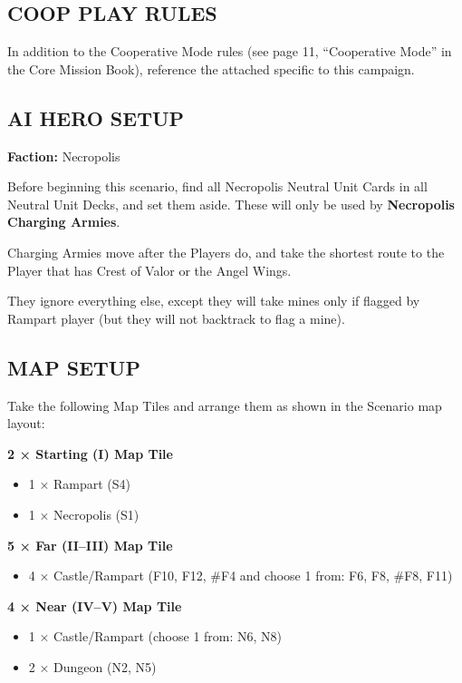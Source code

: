 \begin{multicols*}{2}
\subsection*{\MakeUppercase{Coop Play Rules}}

In addition to the Cooperative Mode rules (see page 11, ``Cooperative Mode'' in the Core Mission Book), reference the attached  specific to this campaign.

\subsection*{\MakeUppercase{AI Hero Setup}}

\textbf{Faction:} Necropolis

Before beginning this scenario, find all Necropolis Neutral Unit Cards in all Neutral Unit Decks, and set them aside.
These will only be used by \textbf{Necropolis Charging Armies}.

Charging Armies move after the Players do, and take the shortest route to the Player that has Crest of Valor or the Angel Wings.

They ignore everything else, except they will take mines only if flagged by Rampart player (but they will not backtrack to flag a mine).

\subsection*{\MakeUppercase{Map Setup}}

Take the following Map Tiles and arrange them as shown in the Scenario map layout:

\textbf{2 × Starting (I) Map Tile}
\begin{itemize}
  \item 1 × Rampart (S4)
  \item 1 × Necropolis (S1)
\end{itemize}

\textbf{5 × Far (II--III) Map Tile}
\begin{itemize}
  \item 4 × Castle/Rampart (F10, F12, \#F4 and choose 1 from: F6, F8, \#F8, F11)
\end{itemize}

\textbf{4 × Near (IV--V) Map Tile}
\begin{itemize}
  \item 1 × Castle/Rampart (choose 1 from: N6, N8)
  \item 2 × Dungeon (N2, N5)
\end{itemize}


\end{multicols*}
